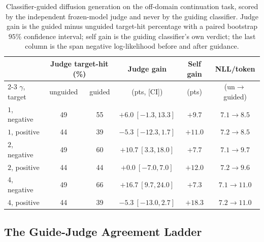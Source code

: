 \begin{table}[h]
    \centering
    \small
    \begin{tabular}{lccccc}
        \toprule
        & \multicolumn{2}{c}{Judge target-hit (\%)} & Judge gain & Self gain & NLL/token \\
        \cmidrule(lr){2-3}
        $\gamma$, target & unguided & guided & (pts, [CI]) & (pts) & (un$\to$guided) \\
        \midrule
        $1$, negative & 49 & 55 & $+6.0\ [-1.3,13.3]$ & $+9.7$ & $7.1\to8.5$ \\
        $1$, positive & 44 & 39 & $-5.3\ [-12.3,1.7]$ & $+11.0$ & $7.2\to8.5$ \\
        $2$, negative & 49 & 60 & $+10.7\ [3.3,18.0]$ & $+7.7$ & $7.1\to9.7$ \\
        $2$, positive & 44 & 44 & $+0.0\ [-7.0,7.0]$ & $+12.0$ & $7.2\to9.6$ \\
        $4$, negative & 49 & 66 & $+16.7\ [9.7,24.0]$ & $+7.3$ & $7.1\to11.0$ \\
        $4$, positive & 44 & 39 & $-5.3\ [-13.0,2.7]$ & $+18.3$ & $7.2\to11.0$ \\
        \bottomrule
    \end{tabular}
    \caption[Off-domain classifier-guided diffusion generation.]{Classifier-guided diffusion generation on the off-domain continuation task, scored by the independent frozen-model judge and never by the guiding classifier. Judge gain is the guided minus unguided target-hit percentage with a paired bootstrap $95\%$ confidence interval; self gain is the guiding classifier's own verdict; the last column is the span negative log-likelihood before and after guidance.}
    \label{tab:diffusion-guided}
\end{table}

\subsection{The Guide-Judge Agreement Ladder}
\label{app:guided-ladder}

